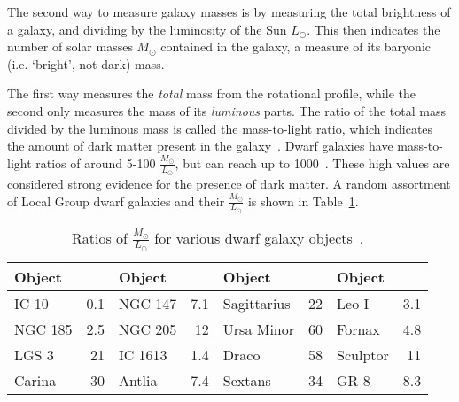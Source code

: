 The second way to measure galaxy masses is by measuring the total brightness of a galaxy, and dividing by the luminosity of the Sun $L_\odot$.
This then indicates the number of solar masses $M_\odot$ contained in the galaxy, a measure of its baryonic (i.e. `bright', not dark) mass.
    
The first way measures the \textit{total} mass from the rotational profile, while the second only measures the mass of its \textit{luminous} parts.
The ratio of the total mass divided by the luminous mass is called the mass-to-light ratio, which indicates the amount of dark matter present in the galaxy~\cite{faber_ml}.
Dwarf galaxies have mass-to-light ratios of around 5-100 $\frac{M_\odot}{L_\odot}$, but can reach up to \nicetilde \SI{1000}{}~\cite{Simon2007_dwarfgalaxykeck}.
These high values are considered strong evidence for the presence of dark matter.
A random assortment of Local Group dwarf galaxies and their $\frac{M_\odot}{L_\odot}$ is shown in Table~\ref{tab:mlratios:dwarfgals}.
    
\begin{table}[h]
  \centering
  \begin{tabular}{l r | l r | l r | l r}
    Object      &  \mlratio{} & Object & \mlratio{} & Object & \mlratio{} & Object & \mlratio{} \\
    \hline
    IC 10       &  0.1 & NGC 147    &  7.1 & Sagittarius & 22 & Leo I    &  3.1 \\
    NGC 185     &  2.5 & NGC 205    & 12   & Ursa Minor  & 60 & Fornax   &  4.8 \\
    LGS 3       & 21   & IC 1613    &  1.4 & Draco       & 58 & Sculptor & 11   \\
    Carina      & 30   & Antlia     &  7.4 & Sextans     & 34 & GR 8     &  8.3 \\
  \end{tabular}
  \caption[Ratios of $\frac{\textrm{M}_\odot}{\textrm{L}_\odot}$ for Various Dwarf Galaxy Objects]{
    Ratios of $\frac{M_\odot}{L_\odot}$ for various dwarf galaxy objects~\cite{localdwarfs}.
    \CaptionBlankLine
  }
  \label{tab:mlratios:dwarfgals}
\end{table}
    
